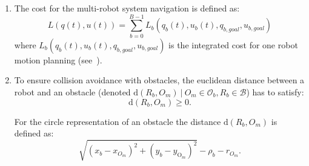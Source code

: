 \documentclass[eprint]{actapoly}
\begin{document}
\begin{enumerate}
    \item The cost for the multi-robot system navigation is defined as:
    \begin{equation}
        L(q(t),u(t)) = \sum_{b=0}^{B-1}L_b(q_b(t), u_b(t), q_{b,goal},u_{b,goal})
    \end{equation}
    where $L_b(q_b(t), u_b(t), q_{b,goal},u_{b,goal})$ is the 
    integrated cost for one robot
    motion planning (see~\cite{Defoort2009}).
    
    \item 
    To ensure collision avoidance with obstacles, the euclidean 
    distance between
    a robot and an obstacle (denoted $\mathrm{d}(R_b, O_m)\ |\ O_m
    \in \mathcal{O}_b, R_b \in \mathcal{B} $) has to satisfy:
    \begin{equation}
    	\mathrm{d}(R_b, O_m) \geq 0.
    \end{equation}
    
    For the circle representation of an obstacle the distance
    $\mathrm{d}(R_b, O_m)$ is defined as:
    \begin{equation*}
        \sqrt{(x_{b} - x_{O_m})^2 + (y_{b} - y_{\mathrm{O}_m})^2}  - \rho_b - r_{O_m}.
    \end{equation*}
    

\end{enumerate}
\end{document}
